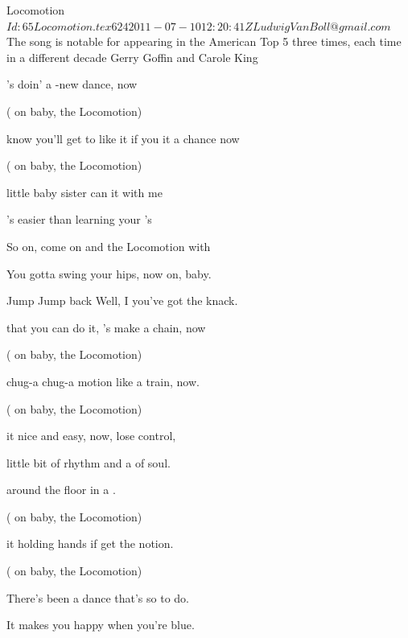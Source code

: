 \begin{SBSong}{Locomotion}
  {$Id: 65Locomotion.tex 624 2011-07-10 12:20:41Z LudwigVanBoll@gmail.com $}
  {The song is notable for appearing in the American Top 5 three times, each time in a different decade}
  {Gerry Goffin and Carole King}
  \SBDirection{}
  \begin{SBVerse}
	's doin' a -new dance, now
	
	( on baby,  the Locomotion)
	
	 know you'll get to like it if you  it a chance now
	
	( on baby,  the Locomotion)
	
	 little baby sister can  it with me
	
	's easier than learning your 's
  \end{SBVerse}
  \begin{SBChorus}
	So  on, come on and  the Locomotion with 
	
	You gotta swing your hips, now  on, baby.
	
	Jump  Jump back Well, I  you've got the knack.
  \end{SBChorus}
  \begin{SBVerse}
	 that you can do it, 's make a chain, now
	
	( on baby,  the Locomotion)
	
	 chug-a chug-a motion like a  train, now.
	
	( on baby,  the Locomotion)
	
	 it nice and easy, now,  lose control,
	
	 little bit of rhythm and a  of soul.
  \end{SBVerse}
  \begin{SBVerse}
	 around the floor in a .
	
	( on baby,  the Locomotion)
	
	 it holding hands if  get the notion.
	
	( on baby,  the Locomotion)
	
	There's  been a dance that's so  to do.
	
	It  makes you happy when you're  blue.
  \end{SBVerse}
\end{SBSong}
